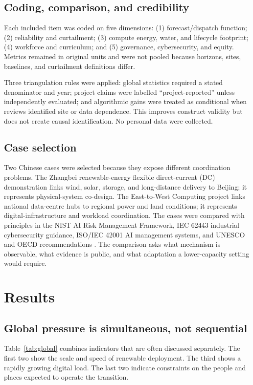 \documentclass[12pt]{article}
\begin{document}
\subsection{Coding, comparison, and credibility}
Each included item was coded on five dimensions: (1) forecast/dispatch function; (2) reliability and curtailment; (3) compute energy, water, and lifecycle footprint; (4) workforce and curriculum; and (5) governance, cybersecurity, and equity. Metrics remained in original units and were not pooled because horizons, sites, baselines, and curtailment definitions differ.

Three triangulation rules were applied: global statistics required a stated denominator and year; project claims were labelled ``project-reported'' unless independently evaluated; and algorithmic gains were treated as conditional when reviews identified site or data dependence. This improves construct validity but does not create causal identification. No personal data were collected.

\subsection{Case selection}
Two Chinese cases were selected because they expose different coordination problems. The Zhangbei renewable-energy flexible direct-current (DC) demonstration links wind, solar, storage, and long-distance delivery to Beijing; it represents physical-system co-design. The East-to-West Computing project links national data-centre hubs to regional power and land conditions; it represents digital-infrastructure and workload coordination. The cases were compared with principles in the NIST AI Risk Management Framework, IEC 62443 industrial cybersecurity guidance, ISO/IEC 42001 AI management systems, and UNESCO and OECD recommendations \citep{nist2023,iec62443,iso42001,unesco2021,oecd2019}. The comparison asks what mechanism is observable, what evidence is public, and what adaptation a lower-capacity setting would require.

\section{Results}

\subsection{Global pressure is simultaneous, not sequential}
Table~\ref{tab:global} combines indicators that are often discussed separately. The first two show the scale and speed of renewable deployment. The third shows a rapidly growing digital load. The last two indicate constraints on the people and places expected to operate the transition.
\end{document}
